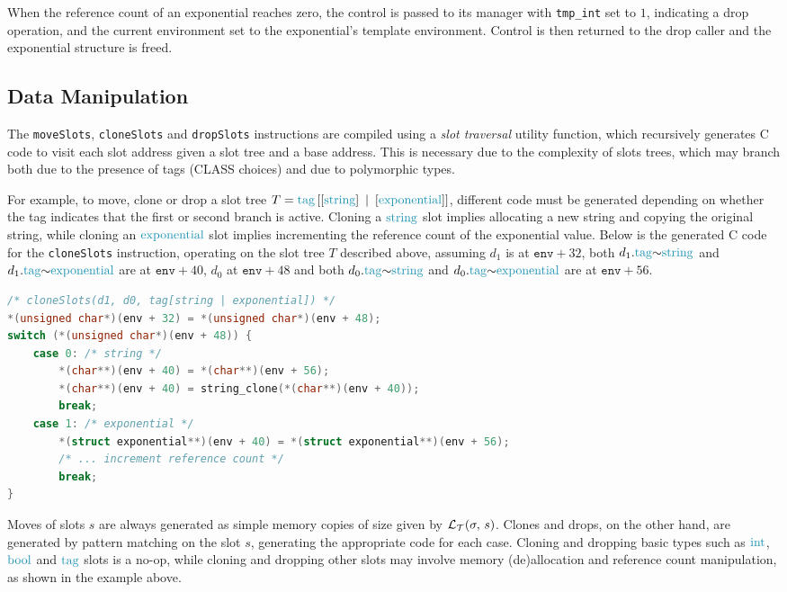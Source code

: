 When the reference count of an exponential reaches zero, the control is passed to its manager with \texttt{tmp\_int} set to $1$, indicating a drop operation, and the current environment set to the exponential's template environment. Control is then returned to the drop caller and the exponential structure is freed.

\subsection{Data Manipulation}

The \texttt{moveSlots}, \texttt{cloneSlots} and \texttt{dropSlots} instructions are compiled using a \textit{slot traversal} utility function, which recursively generates C code to visit each slot address given a slot tree and a base address. This is necessary due to the complexity of slots trees, which may branch both due to the presence of tags (\ac{CLASS} choices) and due to polymorphic types.

For example, to move, clone or drop a slot tree $T = \tagst{\seqst{\strings}\tagsepst\seqst{\exponentials}}$, different code must be generated depending on whether the tag indicates that the first or second branch is active. Cloning a $\strings$ slot implies allocating a new string and copying the original string, while cloning an $\exponentials$ slot implies incrementing the reference count of the exponential value. Below is the generated C code for the \texttt{cloneSlots} instruction, operating on the slot tree $T$ described above, assuming $d_1$ is at $\texttt{env} + 32$, both $\datal{d_1}{\tags}{\strings}$ and $\datal{d_1}{\tags}{\exponentials}$ are at $\texttt{env} + 40$, $d_0$ at $\texttt{env} + 48$ and both $\datal{d_0}{\tags}{\strings}$ and $\datal{d_0}{\tags}{\exponentials}$ are at $\texttt{env} + 56$.

\begin{lstlisting}[language=C, frame=bottom]
/* cloneSlots(d1, d0, tag[string | exponential]) */
*(unsigned char*)(env + 32) = *(unsigned char*)(env + 48);
switch (*(unsigned char*)(env + 48)) {
    case 0: /* string */
        *(char**)(env + 40) = *(char**)(env + 56);
        *(char**)(env + 40) = string_clone(*(char**)(env + 40));
        break;
    case 1: /* exponential */
        *(struct exponential**)(env + 40) = *(struct exponential**)(env + 56);
        /* ... increment reference count */
        break;
}
\end{lstlisting}

Moves of slots $s$ are always generated as simple memory copies of size given by $\mathcal{L}_{\mathcal{T}}(\sigma,\,s)$. Clones and drops, on the other hand, are generated by pattern matching on the slot $s$, generating the appropriate code for each case. Cloning and dropping basic types such as $\ints$, $\bools$ and $\tags$ slots is a no-op, while cloning and dropping other slots may involve memory (de)allocation and reference count manipulation, as shown in the example above.

